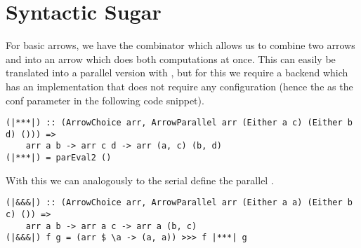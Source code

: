 \section{Syntactic Sugar} \label{syntacticSugar}
For basic arrows, we have the \code{***} combinator which allows us to combine two arrows  and  into an arrow  which does both computations at once. This can easily be translated into a parallel version with , but for this we require a backend which has an implementation that does not require any configuration (hence the \code{()} as the conf parameter in the following code snippet).
\begin{lstlisting}[frame=htrbl]
(|***|) :: (ArrowChoice arr, ArrowParallel arr (Either a c) (Either b d) ())) =>
	arr a b -> arr c d -> arr (a, c) (b, d)
(|***|) = parEval2 ()
\end{lstlisting}
With this we can analogously to the serial \code{&&&} define the parallel \code{|&&&|}.
\begin{lstlisting}[frame=htrbl]
(|&&&|) :: (ArrowChoice arr, ArrowParallel arr (Either a a) (Either b c) ()) =>
	arr a b -> arr a c -> arr a (b, c)
(|&&&|) f g = (arr $ \a -> (a, a)) >>> f |***| g
\end{lstlisting}